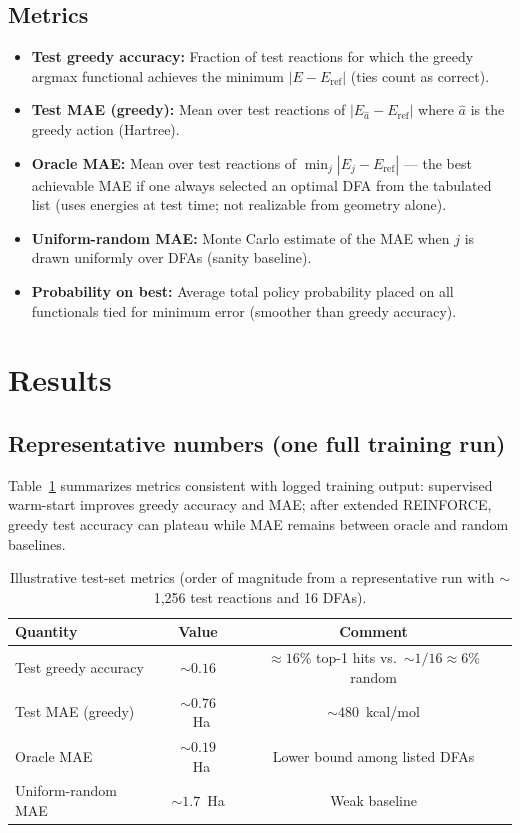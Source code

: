 \documentclass[11pt]{article}
\begin{document}
\subsection{Metrics}
\begin{itemize}
  \item \textbf{Test greedy accuracy:} Fraction of test reactions for which the greedy argmax functional achieves the minimum $|E - E_{\mathrm{ref}}|$ (ties count as correct).
  \item \textbf{Test MAE (greedy):} Mean over test reactions of $|E_{\hat a} - E_{\mathrm{ref}}|$ where $\hat a$ is the greedy action (Hartree).
  \item \textbf{Oracle MAE:} Mean over test reactions of $\min_j |E_j - E_{\mathrm{ref}}|$ --- the best achievable MAE if one always selected an optimal DFA from the tabulated list (uses energies at test time; not realizable from geometry alone).
  \item \textbf{Uniform-random MAE:} Monte Carlo estimate of the MAE when $j$ is drawn uniformly over DFAs (sanity baseline).
  \item \textbf{Probability on best:} Average total policy probability placed on all functionals tied for minimum error (smoother than greedy accuracy).
\end{itemize}

\section{Results}

\subsection{Representative numbers (one full training run)}
Table~\ref{tab:metrics} summarizes metrics consistent with logged training output: supervised warm-start improves greedy accuracy and MAE; after extended REINFORCE, greedy test accuracy can plateau while MAE remains between oracle and random baselines.

\begin{table}[htbp]
  \centering
  \caption{Illustrative test-set metrics (order of magnitude from a representative run with $\sim$1{,}256 test reactions and 16 DFAs).}
  \label{tab:metrics}
  \begin{tabular}{@{}lcc@{}}
    \hline
    Quantity & Value & Comment \\
    \hline
    Test greedy accuracy & $\sim 0.16$ & $\approx 16\%$ top-1 hits vs.\ $\sim 1/16 \approx 6\%$ random \\
    Test MAE (greedy) & $\sim 0.76$~Ha & $\sim 480$~kcal/mol \\
    Oracle MAE & $\sim 0.19$~Ha & Lower bound among listed DFAs \\
    Uniform-random MAE & $\sim 1.7$~Ha & Weak baseline \\
    \hline
  \end{tabular}
\end{table}
\end{document}

